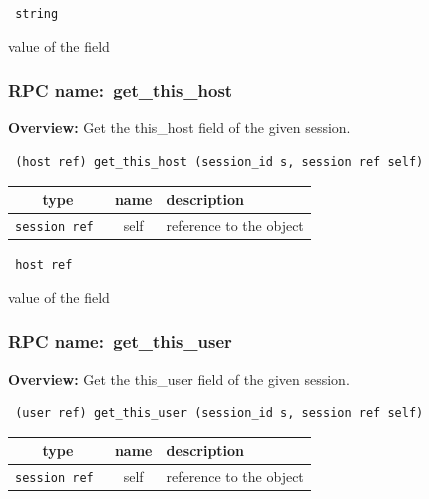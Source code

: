 \vspace{0.3cm}

{\tt 
string
}


value of the field
\vspace{0.3cm}
\vspace{0.3cm}
\vspace{0.3cm}
\subsubsection{RPC name:~get\_this\_host}

{\bf Overview:} 
Get the this\_host field of the given session.

\begin{verbatim} (host ref) get_this_host (session_id s, session ref self)\end{verbatim}



 
\vspace{0.3cm}
\begin{tabular}{|c|c|p{7cm}|}
 \hline
{\bf type} & {\bf name} & {\bf description} \\ \hline
{\tt session ref } & self & reference to the object \\ \hline 

\end{tabular}

\vspace{0.3cm}

{\tt 
host ref
}


value of the field
\vspace{0.3cm}
\vspace{0.3cm}
\vspace{0.3cm}
\subsubsection{RPC name:~get\_this\_user}

{\bf Overview:} 
Get the this\_user field of the given session.

\begin{verbatim} (user ref) get_this_user (session_id s, session ref self)\end{verbatim}



 
\vspace{0.3cm}
\begin{tabular}{|c|c|p{7cm}|}
 \hline
{\bf type} & {\bf name} & {\bf description} \\ \hline
{\tt session ref } & self & reference to the object \\ \hline 

\end{tabular}

